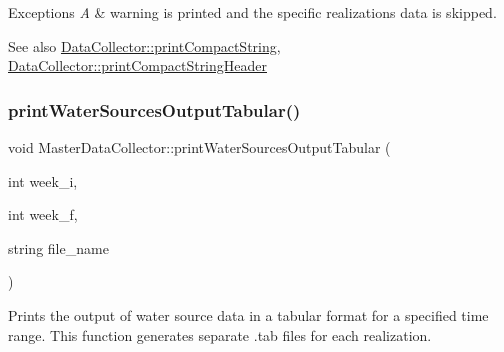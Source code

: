 \begin{DoxyExceptions}{Exceptions}
{\em A} & warning is printed and the specific realization\textquotesingle{}s data is skipped.\\
\hline
\end{DoxyExceptions}
\begin{DoxySeeAlso}{See also}
\mbox{\hyperlink{classDataCollector_a2eac264fa5612aed5a830b12de4f4ae3}{Data\+Collector\+::print\+Compact\+String}}, \mbox{\hyperlink{classDataCollector_a98dcb4ec871d9c7fbf7545c64e5ccc67}{Data\+Collector\+::print\+Compact\+String\+Header}} 
\end{DoxySeeAlso}
\mbox{\label{classMasterDataCollector_a77dd707b686d936118cd4e940156754f}} 
\subsubsection{\texorpdfstring{print\+Water\+Sources\+Output\+Tabular()}{printWaterSourcesOutputTabular()}}
{\footnotesize\ttfamily void Master\+Data\+Collector\+::print\+Water\+Sources\+Output\+Tabular (\begin{DoxyParamCaption}\item[{int}]{week\+\_\+i,  }\item[{int}]{week\+\_\+f,  }\item[{string}]{file\+\_\+name }\end{DoxyParamCaption})}



Prints the output of water source data in a tabular format for a specified time range. This function generates separate {\ttfamily .tab} files for each realization. 


